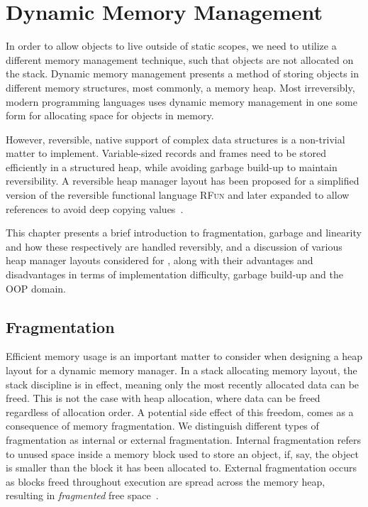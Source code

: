 \chapter{Dynamic Memory Management}
\label{chp:dynamic-memory-management}
In order to allow objects to live outside of static scopes, we need to utilize a different memory management technique, such that objects are not allocated on the stack. Dynamic memory management presents a method of storing objects in different memory structures, most commonly, a memory heap. Most irreversibly, modern programming languages uses dynamic memory management in one some form for allocating space for objects in memory. 

However, reversible, native support of complex data structures is a non-trivial matter to implement. Variable-sized records and frames need to be stored efficiently in a structured heap, while avoiding garbage build-up to maintain reversibility. A reversible heap manager layout has been proposed for a simplified version of the reversible functional language \textsc{RFun} and later expanded to allow references to avoid deep copying values~\cite{ha:heap, ty:rfun, tm:refcounting}.

This chapter presents a brief introduction to fragmentation, garbage and linearity and how these respectively are handled reversibly, and a discussion of various heap manager layouts considered for \rooplpp, along with their advantages and disadvantages in terms of implementation difficulty, garbage build-up and the OOP domain. 


\section{Fragmentation}
\label{sec:fragmentation}
Efficient memory usage is an important matter to consider when designing a heap layout for a dynamic memory manager. In a stack allocating memory layout, the stack discipline is in effect, meaning only the most recently allocated data can be freed. This is not the case with heap allocation, where data can be freed regardless of allocation order. A potential side effect of this freedom, comes as a consequence of memory fragmentation. We distinguish different types of fragmentation as internal or external fragmentation. Internal fragmentation refers to unused space inside a memory block used to store an object, if, say, the object is smaller than the block it has been allocated to. External fragmentation occurs as blocks freed throughout execution are spread across the memory heap, resulting in \textit{fragmented} free space~\cite{tm:languages}. 

